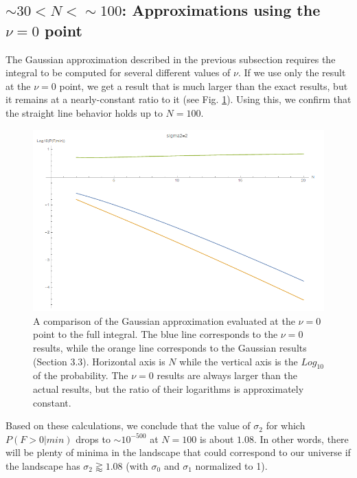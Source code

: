 \documentclass[12pt]{article}
\begin{document}
\subsection{$\sim 30 < N < \sim100$: Approximations using the $\nu=0$ point}

The Gaussian approximation described in the previous subsection requires the integral to be computed for several different values of $\nu$. If we use only the result at the $\nu=0$ point, we get a result that is much larger than the exact results, but it remains at a nearly-constant ratio to it (see Fig. \ref{sigma2=2v=0}). Using this, we confirm that the straight line behavior holds up to $N = 100$.

\begin{figure} 
  \centering
  \includegraphics[width=\linewidth]{sigma2=2v=0.png}
  \caption{A comparison of the Gaussian approximation evaluated at the $\nu=0$ point to the full integral. The blue line corresponds to the $\nu=0$ results, while the orange line corresponds to the Gaussian results (Section 3.3). Horizontal axis is $N$ while the vertical axis is the $Log_{10}$ of the probability. The $\nu=0$ results are always larger than the actual results, but the ratio of their logarithms is approximately constant.}
  \label{sigma2=2v=0}
\end{figure}

Based on these calculations, we conclude that the value of $\sigma_2$ for which $P(F>0|min)$ drops to $\sim 10^{-500}$ at $N = 100$ is about $1.08$. In other words, there will be plenty of minima in the landscape that could correspond to our universe if the landscape has $\sigma_2 \gtrapprox 1.08$ (with $\sigma_0$ and $\sigma_1$ normalized to 1).
\end{document}

